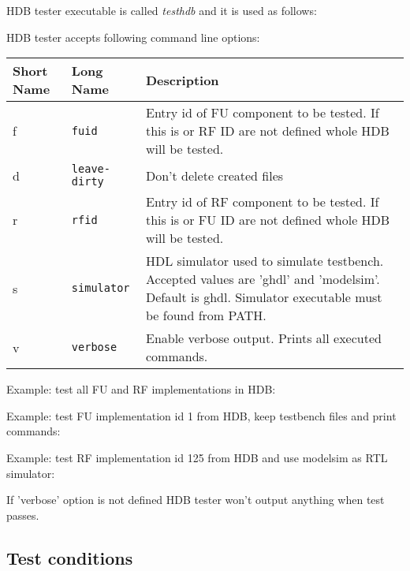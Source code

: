 \documentclass[twoside]{tceusermanual}
\begin{document}
HDB tester executable is called \textit{testhdb} and it is used as follows:


HDB tester accepts following command line options:

\begin{center}
\begin{tabular}[htb]{@{}p{}@{}p{}%
                     @{}p{}}

\textbf{Short Name} &\textbf{Long Name} &\textbf{Description} \\
\hline

f & \verb|fuid| &
Entry id of FU component to be tested. If this is or RF ID are not defined
whole HDB will be tested. \\

d & \verb|leave-dirty| &
Don't delete created files \\

r & \verb|rfid| &
Entry id of RF component to be tested. If this is or FU ID are not defined
whole HDB will be tested. \\

s & \verb|simulator| &
HDL simulator used to simulate testbench. Accepted values are 'ghdl' and
'modelsim'. Default is ghdl. Simulator executable must be found from PATH. \\

v & \verb|verbose| &
Enable verbose output. Prints all executed commands. \\

\end{tabular}
\end{center}

Example: test all FU and RF implementations in HDB:


Example: test FU implementation id 1 from HDB, keep testbench files and print
commands:


Example: test RF implementation id 125 from HDB and use modelsim as RTL
simulator:


If 'verbose' option is not defined HDB tester won't output anything when test
passes.

\subsection{Test conditions}
\end{document}
